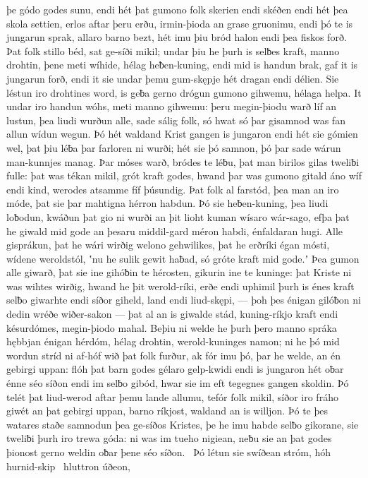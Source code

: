 þe gódo godes sunu, endi hét þat gumono folk
skerien endi skéðen endi hét þea skola settien,
erlos aftar þeru erðu, irmin-þioda
an grase gruonimu, endi þó te is jungarun sprak,
allaro barno bezt, hét imu þiu bród halon
endi þea fiskos forð. Þat folk stillo béd,
sat ge-síði mikil; undar þiu he þurh is selƀes kraft,
manno drohtin, þene meti wíhide,
hélag heƀen-kuning, endi mid is handun brak,
gaf it is jungarun forð, endi it sie undar þemu gum-skępje hét
dragan endi délien. Sie léstun iro drohtines word,
is geƀa gerno drógun gumono gihwemu,
hélaga helpa. It undar iro handun wóhs,
meti manno gihwemu: þeru megin-þiodu warð
líf an lustun, þea liudi wurðun alle,
sade sálig folk, só hwat só þar gisamnod was
fan allun wídun wegun. Þó hét waldand Krist
gangen is jungaron endi hét sie gómien wel,
þat þiu léƀa þar farloren ni wurði;
hét sie þó samnon, þó þar sade wárun
man-kunnjes manag. Þar móses warð,
bródes te léƀu, þat man birilos gilas
tweliƀi fulle: þat was tékan mikil,
grót kraft godes, hwand þar was gumono gitald
áno wíf endi kind, werodes atsamme
fíf þúsundig. Þat folk al farstód,
þea man an iro móde, þat sie þar mahtigna
hérron habdun. Þó sie heƀen-kuning,
þea liudi loƀodun, kwáðun þat gio ni wurði an þit lioht kuman
wísaro wár-sago, efþa þat he giwald mid gode
an þesaru middil-gard méron habdi,
énfaldaran hugi. Alle gisprákun,
þat he wári wirðig welono gehwilikes,
þat he erðríki égan mósti,
wídene weroldstól, ʽnu he sulik gewit haƀad,
só gróte kraft mid gode.ʼ Þea gumon alle giwarð,
þat sie ine gihóƀin te hérosten,
gikurin ine te kuninge: þat Kriste ni was
wihtes wirðig, hwand he þit werold-ríki,
erðe endi uphimil þurh is énes kraft
selƀo giwarhte endi síðor giheld,
land endi liud-skępi, — þoh þes énigan gilóƀon ni dedin
wréðe wiðer-sakon — þat al an is giwalde stád,
kuning-ríkjo kraft endi késurdómes,
megin-þiodo mahal. Beþiu ni welde he þurh þero manno spráka
hębbjan énigan hérdóm, hélag drohtin,
werold-kuninges namon; ni he þó mid wordun stríd
ni af-hóf wið þat folk furður, ak fór imu þó, þar he welde,
an én gebirgi uppan: flóh þat barn godes
gélaro gelp-kwidi endi is jungaron hét
oƀar énne séo síðon endi im selƀo gibód,
hwar sie im eft tegegnes gangen skoldin.
Þó telét þat liud-werod aftar þemu lande allumu,
tefór folk mikil, síðor iro fráho giwét
an þat gebirgi uppan, barno ríkjost,
waldand an is willjon. Þó te þes watares staðe
samnodun þea ge-síðos Kristes, þe he imu habde selƀo gikorane,
sie tweliƀi þurh iro trewa góda: ni was im tueho nigiean,
neƀu sie an þat godes þionost gerno weldin
oƀar þene séo síðon. \hld\ Þó létun sie swíðean stróm,
hóh hurnid-skip \hld\ hluttron úðeon,
